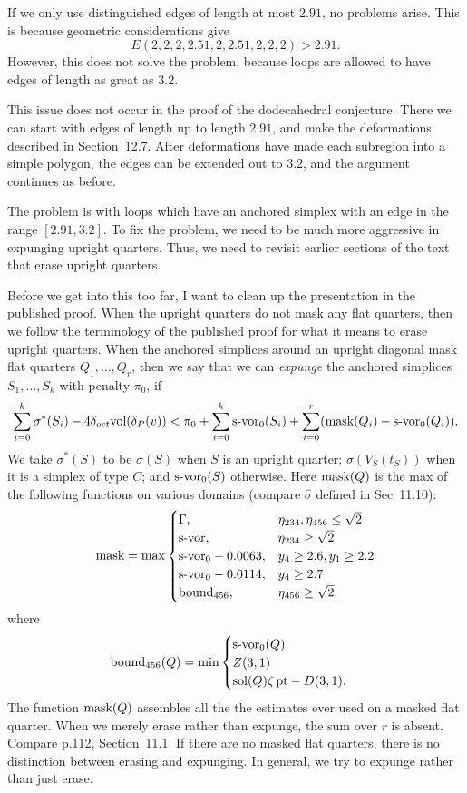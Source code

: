 \documentclass[11pt]{amsart}
\def\op#1{{\text{#1}}}
\def\text{\hbox}
\begin{document}
If we only use distinguished edges of length
at most $2.91$, no problems arise.  This is
because geometric considerations give
  $$E(2,2,2,2.51,2,2.51,2,2,2) > 2.91.$$
However, this does not solve the problem, because
loops are allowed to have edges of length as
great as $3.2$.

This issue does not occur in the proof of the dodecahedral conjecture.  There we can start with edges of length up to length $2.91$, and make the deformations described in Section~12.7.  After deformations have made each subregion into a simple polygon, the edges can be extended out to $3.2$, and the argument continues as before.

The problem is with loops which have an anchored simplex with an edge in the range $[2.91,3.2]$.  To fix the problem, we need to be much more aggressive 
in expunging upright quarters.  Thus, we need to revisit earlier sections of the text that erase upright quarters.

Before we get into this too far, I want to clean up the presentation in the published proof.  When the upright quarters do not mask any flat quarters, then we follow the terminology of the published proof for what it means to erase upright quarters.  When the anchored simplices around an upright diagonal mask flat quarters $Q_1,\ldots,Q_r$, then we say that we can {\it expunge} the anchored simplices $S_1,\ldots,S_k$ with penalty $\pi_0$, if 
  $$
  \sum_{i=0}^k \sigma^*(S_i) - 4\delta_{oct}\op{vol}(\delta_P(v))
  < \pi_0 + \sum_{i=0}^k \op{s-vor}_0(S_i)
   +\sum_{i=0}^r (\op{mask}(Q_i) - \op{s-vor}_0(Q_i)).
  $$
We take $\sigma^*(S)$ to be $\sigma(S)$ when $S$ is an upright quarter; $\sigma(V_S(t_S))$ when it is a simplex of type $C$; and $\op{s-vor}_0(S)$ otherwise.
Here $\op{mask}(Q)$ is the max of the following functions on
various domains (compare $\hat\sigma$ defined in Sec~11.10):
  $$
  \op{mask} = \max
  \begin{cases}
  \Gamma,   & \eta_{234},\eta_{456}\le \sqrt2\\
  \op{s-vor}, & \eta_{234}\ge \sqrt2\\
  \op{s-vor}_0 - 0.0063, & y_4\ge 2.6, y_1\ge 2.2\\
  \op{s-vor}_0 - 0.0114, & y_4 \ge 2.7\\
  \op{bound}_{456}, & \eta_{456}\ge \sqrt2.\\
  \end{cases}
  $$
where
  $$
  \op{bound}_{456}(Q) = \min
  \begin{cases}
  \op{s-vor}_0(Q) &\\
  Z(3,1) &\\
  \op{sol}(Q)\zeta\,\op{pt} - D(3,1).&\\
  \end{cases}
  $$
The function $\op{mask}(Q)$ assembles all the the estimates ever used
on a masked flat quarter.
When we merely erase rather than expunge, the sum over $r$ is absent. Compare p.112, Section~11.1.
If there are no masked flat quarters,  there is no distinction between erasing and expunging.   In general, we try to expunge rather than just erase.
\end{document}
